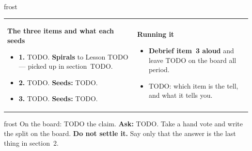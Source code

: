 \documentclass[10pt]{article}
\begin{document}
\begin{fixedskillbox}{frost}
\begin{tabularx}{\linewidth}{@{}X X@{}}
\begin{minipage}[t]{\linewidth}\vspace{0pt}
    \textbf{The three items and what each seeds}
    \begin{itemize}[leftmargin=1.1em, itemsep=1pt, topsep=2pt]
      \item \textbf{1.} TODO. \textbf{Spirals} to Lesson TODO --- picked up in section~TODO.
      \item \textbf{2.} TODO. \textbf{Seeds:} TODO.
      \item \textbf{3.} TODO. \textbf{Seeds:} TODO.
    \end{itemize}
\end{minipage}
&
\begin{minipage}[t]{\linewidth}\vspace{0pt}
    \textbf{Running it}
    \begin{itemize}[leftmargin=1.1em, itemsep=1pt, topsep=2pt]
      \item \textbf{Debrief item~3 aloud} and leave TODO on the board all period.
      \item TODO: which item is the tell, and what it tells you.
    \end{itemize}
\end{minipage}
\end{tabularx}
\end{fixedskillbox}

\boxguard
\begin{skillbox}{frost}
On the board: TODO the claim. \textbf{Ask:} TODO. Take a hand vote and write the split on the
board. \textbf{Do not settle it.} Say only that the answer is the last thing in section~2.
\end{skillbox}
\end{document}
